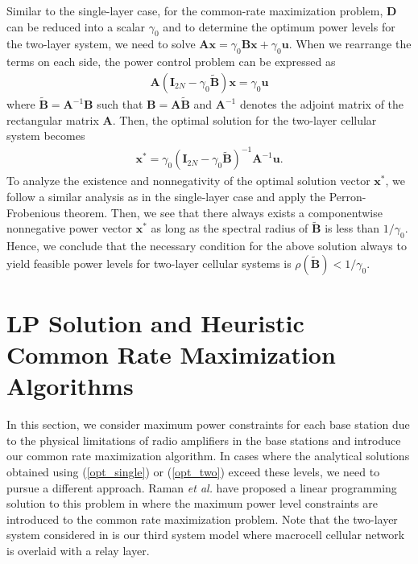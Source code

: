 \documentclass[conference,letterpaper,final,10pt]{IEEEtran}
\begin{document}
Similar to the single-layer case, for the common-rate maximization problem, $\textbf{D}$ can be reduced into a scalar $\gamma_0$ and to determine the optimum power levels for the two-layer system, we need to solve $\textbf{A} \textbf{x} = \gamma_0 \textbf{B} \textbf{x} +
\gamma_0 \textbf{u}$. When we rearrange the terms on each side, the power control problem can
be expressed as
\begin{align} \textbf{A} \left(\textbf{I}_{2N} - \gamma_0 \widetilde{\textbf{B}} \right) \textbf{x} = \gamma_0 \textbf{u} \end{align}
where $\widetilde{\textbf{B}} =
\textbf{A}^{-1} \textbf{B}$ such that $\textbf{B}  = \textbf{A}\widetilde{\textbf{B}}$ and
$\textbf{A}^{-1}$ denotes the adjoint matrix of the rectangular matrix $\textbf{A}$. Then, the
optimal solution for the two-layer cellular system becomes
\begin{align} \label{opt_two} \textbf{x}^* = \gamma_0 (\textbf{I}_{2N} - \gamma_0 \widetilde{\textbf{B}})^{-1} \textbf{A}^{-1} \textbf{u}.
\end{align}
To analyze the existence and nonnegativity of the optimal solution vector $\textbf{x}^*$, we follow a similar analysis as
in the single-layer case and apply the Perron-Frobenious theorem. Then, we see that there always exists a componentwise
nonnegative power vector $\textbf{x}^*$ as long as the spectral radius of $\widetilde{\textbf{B}}$ is less than $1/\gamma_0$. Hence, we conclude that the necessary condition for the above solution always to yield feasible power levels for two-layer cellular systems is $\rho(\widetilde{\textbf{B}})<1/\gamma_0$.

\section{LP Solution and Heuristic Common Rate Maximization Algorithms}\label{LPTitle}
In this section, we consider maximum power constraints for each base station due to the physical limitations of radio amplifiers in the base stations and introduce our common rate maximization algorithm. In cases where the analytical solutions obtained using (\ref{opt_single}) or (\ref{opt_two}) exceed these levels, we need to pursue a different approach. Raman \emph{et al.} have proposed a linear programming solution to this problem in \cite{RamanConf} where the maximum power level constraints are introduced to the common rate maximization problem. Note that the two-layer system considered in \cite{RamanConf} is our third system model where macrocell cellular network is overlaid with a relay layer.
\end{document}
